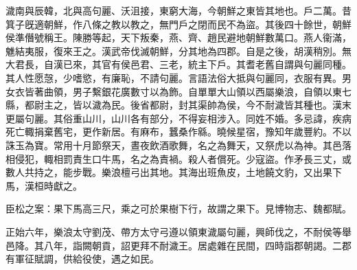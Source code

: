 
\begin{pinyinscope}
濊南與辰韓，北與高句麗、沃沮接，東窮大海，今朝鮮之東皆其地也。戶二萬。昔箕子旣適朝鮮，作八條之教以教之，無門戶之閉而民不為盜。其後四十餘世，朝鮮侯準僭號稱王。陳勝等起，天下叛秦，燕、齊、趙民避地朝鮮數萬口。燕人衞滿，魋結夷服，復來王之。漢武帝伐滅朝鮮，分其地為四郡。自是之後，胡漢稍別。無大君長，自漢已來，其官有侯邑君、三老，統主下戶。其耆老舊自謂與句麗同種。其人性愿愨，少嗜慾，有廉恥，不請句麗。言語法俗大抵與句麗同，衣服有異。男女衣皆著曲領，男子繫銀花廣數寸以為飾。自單單大山領以西屬樂浪，自領以東七縣，都尉主之，皆以濊為民。後省都尉，封其渠帥為侯，今不耐濊皆其種也。漢末更屬句麗。其俗重山川，山川各有部分，不得妄相涉入。同姓不婚。多忌諱，疾病死亡輙捐棄舊宅，更作新居。有麻布，蠶桑作緜。曉候星宿，豫知年歲豐約。不以誅玉為寶。常用十月節祭天，晝夜飲酒歌舞，名之為舞天，又祭虎以為神。其邑落相侵犯，輙相罰責生口牛馬，名之為責禍。殺人者償死。少寇盜。作矛長三丈，或數人共持之，能步戰。樂浪檀弓出其地。其海出班魚皮，土地饒文豹，又出果下馬，漢桓時獻之。

臣松之案：果下馬高三尺，乘之可於果樹下行，故謂之果下。見博物志、魏都賦。

正始六年，樂浪太守劉茂、帶方太守弓遵以領東濊屬句麗，興師伐之，不耐侯等舉邑降。其八年，詣闕朝貢，詔更拜不耐濊王。居處雜在民間，四時詣郡朝謁。二郡有軍征賦調，供給役使，遇之如民。


\end{pinyinscope}